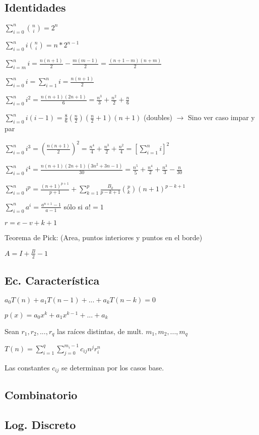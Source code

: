 \subsection{Identidades}
{
$\sum_{i=0}^n\binom{n}{i}=2^n$

$\sum_{i=0}^n i\binom{n}{i}=n*2^{n-1}$

$\sum_{i=m}^n i = \frac{n(n+1)}{2} - \frac{m(m-1)}{2} = \frac{(n+1-m)(n+m)}{2}$

$\sum_{i=0}^n i = \sum_{i=1}^n i = \frac{n(n+1)}{2}$

$\sum_{i=0}^n i^2 = \frac{n(n+1)(2n+1)}{6} = \frac{n^3}{3} + \frac{n^2}{2} + \frac{n}{6}$

$\sum_{i=0}^n i(i-1) = \frac{8}{6}(\frac{n}{2})(\frac{n}{2}+1)(n+1)$ (doubles) $\rightarrow$ Sino ver caso impar y par

$\sum_{i=0}^n i^3 = \left(\frac{n(n+1)}{2}\right)^2 = \frac{n^4}{4} + \frac{n^3}{2} + \frac{n^2}{4} = \left[\sum_{i=1}^n i\right]^2$

$\sum_{i=0}^n i^4 = \frac{n(n+1)(2n+1)(3n^2+3n-1)}{30} = \frac{n^5}{5} + \frac{n^4}{2} + \frac{n^3}{3} - \frac{n}{30}$

$\sum_{i=0}^n i^p = \frac{(n+1)^{p+1}}{p+1} + \sum_{k=1}^p\frac{B_k}{p-k+1}{p\choose k}(n+1)^{p-k+1}$

$\sum_{i=0}^n a^i = \frac{a^{n+1}-1}{a-1}$ sólo si $a!=1$

$r=e-v+k+1$

Teorema de Pick: (Area, puntos interiores y puntos en el borde)

$A=I+\frac{B}{2}-1$

}%

\subsection{Ec. Caracter\'istica}
$a_0T(n)+a_1T(n-1)+...+a_kT(n-k)=0$

$p(x)=a_0 x^k + a_1 x^{k-1} + ... + a_k$

Sean $r_1,r_2,...,r_q$ las raíces distintas, de mult. $m_1, m_2, ..., m_q$

$T(n)=\sum_{i=1}^q{\sum_{j=0}^{m_i - 1}c_{ij} n^j r_i^n}$

Las constantes $c_{ij}$ se determinan por los casos base.
\subsection{Combinatorio}
\subsection{Log. Discreto} 
